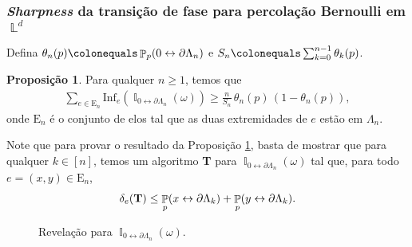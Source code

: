 \documentclass[9pt]{beamer}
\theoremstyle{definition} %
\newtheorem{mypro}{Proposição}
\DeclareMathOperator{\PX}{\mathbb{P}} %
\DeclareMathOperator{\IX}{\mathbb{I}} %
\DeclareMathOperator{\LX}{\mathbb{L}} %
\begin{document}
	\begin{frame}[t]
		\frametitle{\textit{Sharpness} da transição de fase para percolação Bernoulli em $\LX^d$}
		Defina $\theta_n(p) \colonequals \PX_p(0 \leftrightarrow \partial\Lambda_n)$ e $S_n \colonequals \sum_{k = 0}^{n-1}\theta_k(p)$.
		\begin{mypro}\label{prop:decai-exp}
			Para qualquer $n \geq 1$, temos que
			\begin{align*}
			\sum_{e \in \text{E}_n} \text{Inf}_e(\IX_{0\leftrightarrow\partial\Lambda_n}(\omega)) \geq \frac{n}{S_n} \, \theta_n(p) \, (1 - \theta_n(p)),
			\end{align*}
			onde $\text{E}_n$ é o conjunto de elos tal que as duas extremidades de $e$ estão em $\Lambda_n$.
		\end{mypro}\pause
		\vspace{-3pt}
		\begin{minipage}[t]{0.55 \textwidth}
			Note que para provar o resultado da Proposição \ref{prop:decai-exp}, basta de mostrar que para qualquer $k \in [n]$, temos um algoritmo \textbf{T} para $\IX_{0\leftrightarrow\partial\Lambda_n}(\omega)$ tal que, para todo $e = (x, y) \in \text{E}_n$,
			\begin{align}\label{eq:revelacoes}
			\delta_e(\text{\textbf{T}}) \leq \PX_p(x \leftrightarrow \partial\Lambda_k) + \PX_p(y \leftrightarrow \partial\Lambda_k).
			\end{align}
		\end{minipage}\pause
		\begin{minipage}[t]{0.45 \textwidth}
			\begin{figure}
				
				\vspace{-9pt}
				\caption{\justifying Revelação para $\IX_{0\leftrightarrow\partial\Lambda_n}(\omega)$.}
				\label{fig:caixa-k}
			\end{figure}
		\end{minipage}
	\end{frame}
\end{document}
